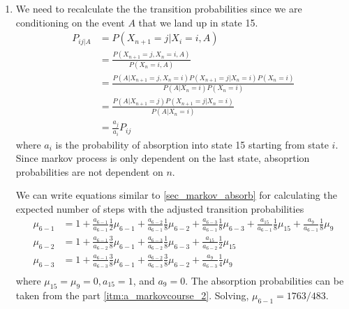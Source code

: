 \documentclass[../probability-notes.tex]{subfiles}
\begin{document}
\begin{enumerate}
\begin{enumerate}
            \item We need to recalculate the the transition probabilities since we are conditioning on the event $A$ that we land up in state 15.
            \begin{align*}
                P_{ij|A} &= P(X_{n+1}=j|X_{i}=i,A)\\
                &= \frac{P(X_{n+1}=j, X_{n}=i, A)}{P(X_{n}=i, A)}\\
                &= \frac{P(A|X_{n+1}=j, X_{n}=i) P(X_{n+1}=j|X_{n}=i) P(X_{n}=i)}{P(A|X_{n}=i) P(X_{n}=i)}\\
                &= \frac{P(A|X_{n+1}=j) P(X_{n+1}=j|X_{n}=i)}{P(A|X_{n}=i)}\\
                &= \frac{a_{j}}{a_{i}} P_{ij}
            \end{align*}
            where $a_{i}$ is the probability of absorption into state 15 starting from state $i$. Since markov process is only dependent on the last state, absoprtion probabilities are not dependent on $n$.\newline

            We can write equations similar to \ref{sec_markov_absorb} for calculating the expected number of steps with the adjusted transition probabilities
            \begin{align*}
                \mu_{6-1} &= 1 + \frac{a_{6-1}}{a_{6-1}}\frac{1}{2} \mu_{6-1} + \frac{a_{6-2}}{a_{6-1}}\frac{1}{8} \mu_{6-2} + \frac{a_{6-3}}{a_{6-1}}\frac{1}{8} \mu_{6-3} + \frac{a_{15}}{a_{6-1}}\frac{1}{8} \mu_{15}+ \frac{a_{9}}{a_{6-1}}\frac{1}{8} \mu_{9}\\
                \mu_{6-2} &= 1 + \frac{a_{6-1}}{a_{6-2}}\frac{3}{8} \mu_{6-1} + \frac{a_{6-3}}{a_{6-2}}\frac{1}{8} \mu_{6-3} + \frac{a_{15}}{a_{6-2}}\frac{1}{2} \mu_{15}\\
                \mu_{6-3} &= 1 + \frac{a_{6-1}}{a_{6-3}}\frac{3}{8} \mu_{6-1} + \frac{a_{6-2}}{a_{6-3}}\frac{3}{8} \mu_{6-2} + \frac{a_{9}}{a_{6-3}}\frac{1}{4} \mu_{9}\\
            \end{align*}
            where $\mu_{15} = \mu_{9} = 0, a_{15} = 1$, and $a_{9} = 0$. The absorption probabilities can be taken from the part \ref{itm:a_markovcourse_2}. Solving, $\mu_{6-1} = 1763/483$.


\end{enumerate}
\end{enumerate}
\end{document}
